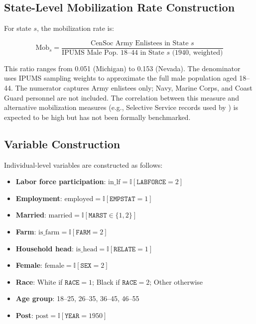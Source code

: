 \documentclass[12pt]{article}
\newcommand{\ind}{\mathbb{I}}
\begin{document}
\subsection{State-Level Mobilization Rate Construction}

For state $s$, the mobilization rate is:

\begin{equation}
\text{Mob}_s = \frac{\text{CenSoc Army Enlistees in State } s}{\text{IPUMS Male Pop.\ 18--44 in State } s \text{ (1940, weighted)}}
\end{equation}

This ratio ranges from 0.051 (Michigan) to 0.153 (Nevada). The denominator uses IPUMS sampling weights to approximate the full male population aged 18--44. The numerator captures Army enlistees only; Navy, Marine Corps, and Coast Guard personnel are not included. The correlation between this measure and alternative mobilization measures (e.g., Selective Service records used by \citealt{acemoglu2004women}) is expected to be high but has not been formally benchmarked.

\subsection{Variable Construction}

Individual-level variables are constructed as follows:

\begin{itemize}
\item \textbf{Labor force participation}: $\text{in\_lf} = \ind[\texttt{LABFORCE} = 2]$
\item \textbf{Employment}: $\text{employed} = \ind[\texttt{EMPSTAT} = 1]$
\item \textbf{Married}: $\text{married} = \ind[\texttt{MARST} \in \{1, 2\}]$
\item \textbf{Farm}: $\text{is\_farm} = \ind[\texttt{FARM} = 2]$
\item \textbf{Household head}: $\text{is\_head} = \ind[\texttt{RELATE} = 1]$
\item \textbf{Female}: $\text{female} = \ind[\texttt{SEX} = 2]$
\item \textbf{Race}: White if $\texttt{RACE} = 1$; Black if $\texttt{RACE} = 2$; Other otherwise
\item \textbf{Age group}: 18--25, 26--35, 36--45, 46--55
\item \textbf{Post}: $\text{post} = \ind[\texttt{YEAR} = 1950]$
\end{itemize}
\end{document}
